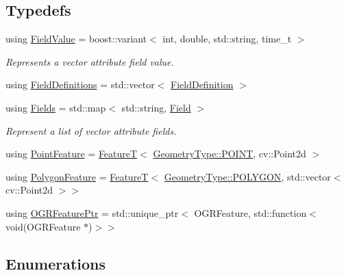 \subsection*{Typedefs}
\begin{DoxyCompactItemize}
\item 
using \hyperlink{group___vector_module_ga4b8ce414fd5c655308a07474c35828c0}{Field\+Value} = boost\+::variant$<$ int, double, std\+::string, time\+\_\+t $>$
\begin{DoxyCompactList}\small\item\em Represents a vector attribute field value. \end{DoxyCompactList}\item 
using \hyperlink{namespacedg_1_1deepcore_1_1vector_a89a39c2fa657ff95f116cfed4a951386}{Field\+Definitions} = std\+::vector$<$ \hyperlink{structdg_1_1deepcore_1_1vector_1_1_field_definition}{Field\+Definition} $>$
\item 
using \hyperlink{group___vector_module_gabeca0d4b0cbea4335ae890255ca59128}{Fields} = std\+::map$<$ std\+::string, \hyperlink{structdg_1_1deepcore_1_1vector_1_1_field}{Field} $>$
\begin{DoxyCompactList}\small\item\em Represent a list of vector attribute fields. \end{DoxyCompactList}\item 
using \hyperlink{namespacedg_1_1deepcore_1_1vector_a2e8401e06dc8648dfe778b719b9a3c19}{Point\+Feature} = \hyperlink{structdg_1_1deepcore_1_1vector_1_1_feature_t}{FeatureT}$<$ \hyperlink{namespacedg_1_1deepcore_1_1vector_gade61c1773afa31064c4eae92cb6bb0b8aaebdbcb765394d25d6a604589a890f82}{Geometry\+Type\+::\+P\+O\+I\+NT}, cv\+::\+Point2d $>$
\item 
using \hyperlink{namespacedg_1_1deepcore_1_1vector_a9c0dc25684d925c9b90c71145c8b8645}{Polygon\+Feature} = \hyperlink{structdg_1_1deepcore_1_1vector_1_1_feature_t}{FeatureT}$<$ \hyperlink{namespacedg_1_1deepcore_1_1vector_gade61c1773afa31064c4eae92cb6bb0b8aecdc92bf56d960b73b02ee40125758bc}{Geometry\+Type\+::\+P\+O\+L\+Y\+G\+ON}, std\+::vector$<$ cv\+::\+Point2d $>$$>$
\item 
using \hyperlink{namespacedg_1_1deepcore_1_1vector_ab18ed4ff537b320bfc6ab749908f0192}{O\+G\+R\+Feature\+Ptr} = std\+::unique\+\_\+ptr$<$ O\+G\+R\+Feature, std\+::function$<$ void(O\+G\+R\+Feature $\ast$)$>$$>$
\end{DoxyCompactItemize}
\subsection*{Enumerations}


